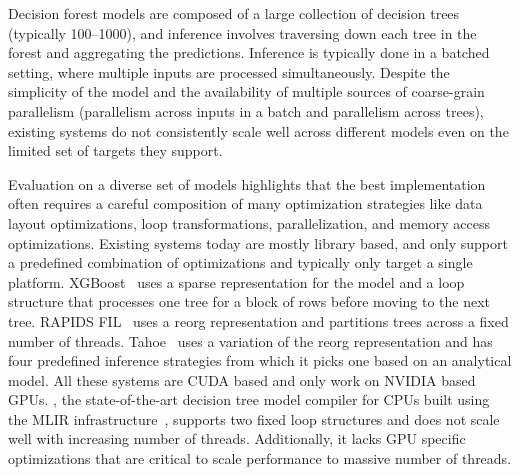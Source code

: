 Decision forest models are composed of a large collection of decision trees (typically 100--1000), and inference involves 
traversing down each tree in the forest and aggregating the predictions. Inference is typically done in a batched
setting, where multiple inputs are processed simultaneously.
Despite the simplicity of the model and the availability of multiple sources of coarse-grain parallelism (parallelism 
across inputs in a batch and parallelism across trees), existing systems do not consistently scale well across different
models even on the limited set of targets they support. 

Evaluation on a diverse set of models highlights that the best implementation often requires a careful composition 
of many optimization strategies like data layout optimizations, 
loop transformations, parallelization, and memory access optimizations. 
Existing systems today are mostly library based, and only support a predefined combination of optimizations
and typically only target a single platform. 
XGBoost~\cite{XGBoost} uses a sparse representation for the model and a loop structure that processes one tree for a block of rows before moving to 
the next tree. RAPIDS FIL~\cite{FIL} uses a reorg representation and partitions trees across a fixed number of threads. 
Tahoe~\cite{Tahoe} uses a
variation of the reorg representation and has four predefined inference strategies from which it picks one based on an analytical model.
All these systems are CUDA based and only work on NVIDIA based GPUs.
\TreebeardOLD{}, the state-of-the-art decision tree model compiler for CPUs 
built using the MLIR infrastructure~\cite{MLIR}, supports two fixed loop structures 
and does not scale well with increasing number of threads. Additionally, it lacks 
GPU specific optimizations that are critical to scale performance to massive number of threads.

